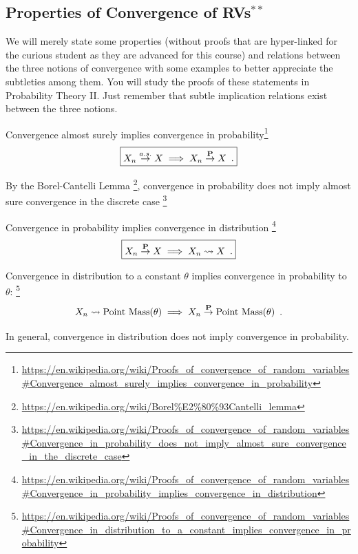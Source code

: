 \subsection{Properties of Convergence of RVs$^{**}$}

We will merely state some properties (without proofs that are hyper-linked for the curious student as they are advanced for this course) and relations between the three notions of convergence with some examples to better appreciate the subtleties among them. 
You will study the proofs of these statements in Probability Theory II. 
Just remember that subtle implication relations exist between the three notions.





\bit
\item Convergence almost surely implies convergence in probability\footnote{{\tiny \url{https://en.wikipedia.org/wiki/Proofs\_of\_convergence\_of\_random\_variables\#Convergence\_almost\_surely\_implies\_convergence\_in\_probability}}}
\[
\boxed{X_n \overset{a.s.}{\to} X \implies X_n \overset{\mathbf{P}}{\to} X \enspace .}
\]
\item By the Borel-Cantelli Lemma \footnote{{\tiny \url{https://en.wikipedia.org/wiki/Borel\%E2\%80\%93Cantelli\_lemma}}}, convergence in probability does not imply almost sure convergence in the discrete case \footnote{{\tiny \url{https://en.wikipedia.org/wiki/Proofs_of_convergence_of_random_variables\#Convergence_in_probability_does_not_imply_almost_sure_convergence_in_the_discrete_case}}}
\item Convergence in probability implies convergence in distribution \footnote{{\tiny \url{https://en.wikipedia.org/wiki/Proofs_of_convergence_of_random_variables\#Convergence_in_probability_implies_convergence_in_distribution}}} 
\[
\boxed{X_n \overset{\mathbf{P}}{\to} X \implies X_n \rightsquigarrow X \enspace .}
\]
\item Convergence in distribution to a constant $\theta$ implies convergence in probability to $\theta$: \footnote{{\tiny \url{https://en.wikipedia.org/wiki/Proofs_of_convergence_of_random_variables\#Convergence_in_distribution_to_a_constant_implies_convergence_in_probability}}}
\[
X_n \rightsquigarrow \mbox{{\rm Point~Mass}}(\theta) \implies X_n \overset{\mathbf{P}}{\to} \mbox{{\rm Point~Mass}}(\theta) \enspace . 
\] 
\item In general, convergence in distribution does not imply convergence in probability.  %
\eit


